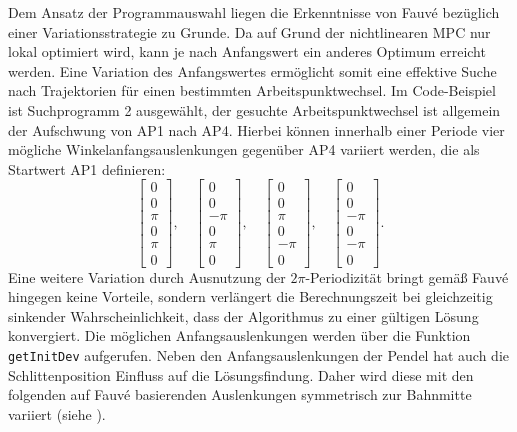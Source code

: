 Dem Ansatz der Programmauswahl liegen die Erkenntnisse von Fauvé \cite{fauve} bezüglich einer Variationsstrategie zu Grunde. Da auf Grund der nichtlinearen MPC nur lokal optimiert wird, kann je nach Anfangswert ein anderes Optimum erreicht werden. Eine Variation des Anfangswertes ermöglicht somit eine effektive Suche nach Trajektorien für einen bestimmten Arbeitspunktwechsel. Im Code-Beispiel ist Suchprogramm 2 ausgewählt, der gesuchte Arbeitspunktwechsel ist allgemein der Aufschwung von AP1 nach AP4. Hierbei können innerhalb einer Periode vier mögliche Winkelanfangsauslenkungen gegenüber AP4 variiert werden, die als Startwert AP1 definieren:
\[
	\begin{bmatrix}
		0 \\ 0 \\ \pi \\ 0 \\ \pi \\ 0
	\end{bmatrix}, \quad
	\begin{bmatrix}
		0 \\ 0 \\ -\pi \\ 0 \\ \pi \\ 0
	\end{bmatrix}, \quad
	\begin{bmatrix}
		0 \\ 0 \\ \pi \\ 0 \\ -\pi \\ 0
	\end{bmatrix}, \quad
	\begin{bmatrix}
		0 \\ 0 \\ -\pi \\ 0 \\ -\pi \\ 0
	\end{bmatrix} .
\]
Eine weitere Variation durch Ausnutzung der $2\pi$-Periodizität bringt gemäß Fauvé \cite{fauve} hingegen keine Vorteile, sondern verlängert die Berechnungszeit bei gleichzeitig sinkender Wahrscheinlichkeit, dass der Algorithmus zu einer gültigen Lösung konvergiert. Die möglichen Anfangsauslenkungen werden über die Funktion \texttt{getInitDev} aufgerufen.
Neben den Anfangsauslenkungen der Pendel hat auch die Schlittenposition Einfluss auf die Lösungsfindung. Daher wird diese mit den folgenden auf Fauvé \cite{fauve} basierenden Auslenkungen symmetrisch zur Bahnmitte variiert (siehe ).
